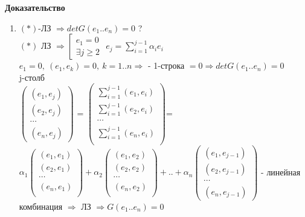 \textbf{Доказательство} \\
\begin{enumerate}
 \item $(*)$-ЛЗ $\Rightarrow detG(e_1..e_n)=0$ ? \\
       $(*)$ ЛЗ $\Rightarrow \left[ \begin{matrix}
			      \mbox{$e_1=0$} \\
			      \mbox{$\exists j \ge 2$}
			      \end{matrix}\right.$ 
       $e_j=\sum \limits_{i=1}^{j-1} {\alpha_i e_i}$\\
       $e_1=0, \ (e_1,e_k)=0, \ k=1..n \Rightarrow$ - 1-строка $=0 \Rightarrow detG(e_1..e_n)=0$ \\
       j-столб\\
       $\begin{pmatrix}
        (e_1,e_j) \\ (e_2,e_j) \\ \cdots \\ (e_n,e_j) 
       \end{pmatrix}$ =
       $\begin{pmatrix}
         \sum \limits_{i=1}^{j-1} {(e_1,e_i)} \\
         \sum \limits_{i=1}^{j-1} {(e_2,e_i)} \\
         \cdots \\
         \sum \limits_{i=1}^{j-1} {(e_n,e_i)} \\
        \end{pmatrix}$=
        $\alpha_1 \begin{pmatrix}
                   (e_1,e_1) \\ (e_2,e_1) \\ \cdots \\ (e_n,e_1) \\
                  \end{pmatrix} +
         \alpha_2 \begin{pmatrix}
                   (e_1,e_2) \\ (e_2,e_2) \\ \cdots \\ (e_n,e_2) \\
                  \end{pmatrix} + .. +
         \alpha_n \begin{pmatrix}
                   (e_1,e_{j-1}) \\ (e_2,e_{j-1}) \\ \cdots \\ (e_n,e_{j-1})
                  \end{pmatrix}$ - линейная комбинация $\Rightarrow$ ЛЗ $\Rightarrow G(e_1..e_n)=0$  

\end{enumerate}
